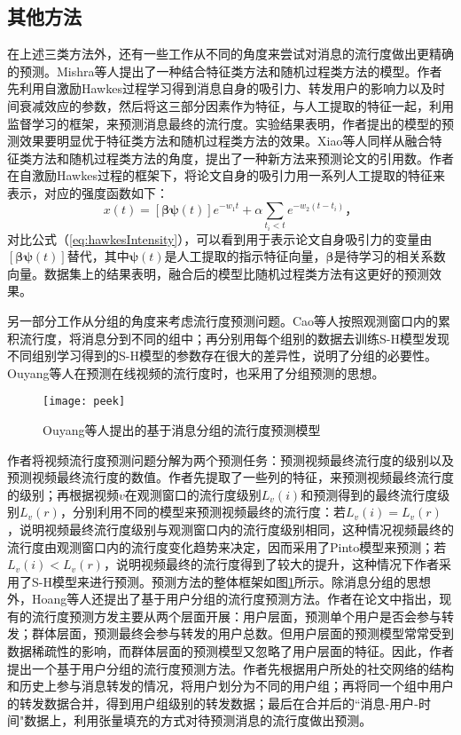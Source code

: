 \subsection{其他方法}
在上述三类方法外，还有一些工作从不同的角度来尝试对消息的流行度做出更精确的预测。Mishra等人\citep{mishra2016feature}提出了一种结合特征类方法和随机过程类方法的模型。作者先利用自激励Hawkes过程学习得到消息自身的吸引力、转发用户的影响力以及时间衰减效应的参数，然后将这三部分因素作为特征，与人工提取的特征一起，利用监督学习的框架，来预测消息最终的流行度。实验结果表明，作者提出的模型的预测效果要明显优于特征类方法和随机过程类方法的效果。Xiao等人\citep{xiao2016modeling}同样从融合特征类方法和随机过程类方法的角度，提出了一种新方法来预测论文的引用数。作者在自激励Hawkes过程的框架下，将论文自身的吸引力用一系列人工提取的特征来表示，对应的强度函数如下：
\begin{equation}
\label{eq:citationIntensity}
x(t)=[\boldsymbol{\beta} \boldsymbol{\psi}(t)]e^{-w_1 t}+\alpha \sum_{t_i<t}e^{-w_2(t-t_i)}\text{，}
\end{equation}
对比公式（\ref{eq:hawkesIntensity}），可以看到用于表示论文自身吸引力的变量由$[\boldsymbol{\beta} \boldsymbol{\psi}(t)]$替代，其中$\boldsymbol{\psi}(t)$是人工提取的指示特征向量，$\boldsymbol{\beta}$是待学习的相关系数向量。数据集上的结果表明，融合后的模型比随机过程类方法有这更好的预测效果。

另一部分工作从分组的角度来考虑流行度预测问题。Cao等人\citep{cao2017predicting}按照观测窗口内的累积流行度，将消息分到不同的组中；再分别用每个组别的数据去训练S-H模型发现不同组别学习得到的S-H模型的参数存在很大的差异性，说明了分组的必要性。Ouyang等人\citep{ouyang2016peek}在预测在线视频的流行度时，也采用了分组预测的思想。
\begin{figure}[!htbp]
  \centering
  \texttt{[image: peek]}
  \caption{Ouyang等人提出的基于消息分组的流行度预测模型\citep{ouyang2016peek}}
  \label{fig:group}
\end{figure}作者将视频流行度预测问题分解为两个预测任务：预测视频最终流行度的级别以及预测视频最终流行度的数值。作者先提取了一些列的特征，来预测视频最终流行度的级别；再根据视频$v$在观测窗口的流行度级别$L_v(i)$和预测得到的最终流行度级别$L_v(r)$，分别利用不同的模型来预测视频最终的流行度：若$L_v(i)=L_v(r)$，说明视频最终流行度级别与观测窗口内的流行度级别相同，这种情况视频最终的流行度由观测窗口内的流行度变化趋势来决定，因而采用了Pinto模型\citep{pinto2013using}来预测；若$L_v(i)<L_v(r)$，说明视频最终的流行度得到了较大的提升，这种情况下作者采用了S-H模型来进行预测。预测方法的整体框架如图\ref{fig:group}所示。除消息分组的思想外，Hoang等人\citep{hoang2017gpop}还提出了基于用户分组的流行度预测方法。作者在论文中指出，现有的流行度预测方发主要从两个层面开展：用户层面，预测单个用户是否会参与转发；群体层面，预测最终会参与转发的用户总数。但用户层面的预测模型常常受到数据稀疏性的影响，而群体层面的预测模型又忽略了用户层面的特征。因此，作者提出一个基于用户分组的流行度预测方法。作者先根据用户所处的社交网络的结构和历史上参与消息转发的情况，将用户划分为不同的用户组；再将同一个组中用户的转发数据合并，得到用户组级别的转发数据；最后在合并后的``消息-用户-时间"数据上，利用张量填充\citep{Kolda2009TDA}的方式对待预测消息的流行度做出预测。

